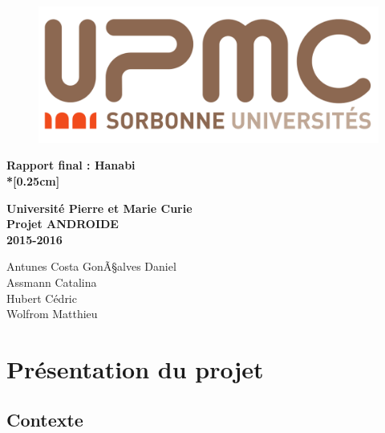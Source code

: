 \documentclass[11pt, letterpaper]{article}
\begin{document}
\pagestyle{fancy}

\renewcommand{\headrulewidth}{1pt}
\rhead{}

\begin{titlepage}

\centering
\begin{figure}[t]
\begin{center}
\includegraphics[scale = 0.2]{upmc.png}
\end{center}
\end{figure}

\begin{center}
\par\vspace {2.5cm}
{\Huge\textbf{Rapport final : Hanabi\\*[0.25cm]}}   
\par\vspace {2cm}
{\Large\textbf{Université Pierre et Marie Curie\\ Projet ANDROIDE\\
               2015-2016}}                   
\par\vspace {2cm}
{\Large{Antunes Costa GonÃ§alves Daniel}}\\
{\Large{Assmann Catalina}}\\ 
{\Large{Hubert Cédric}}\\ 
{\Large{Wolfrom Matthieu}}\\
\end{center}

\end{titlepage}

\newpage

\tableofcontents

\newpage
{}

\section*{Présentation du projet}


\subsection*{Contexte}
\end{document}
